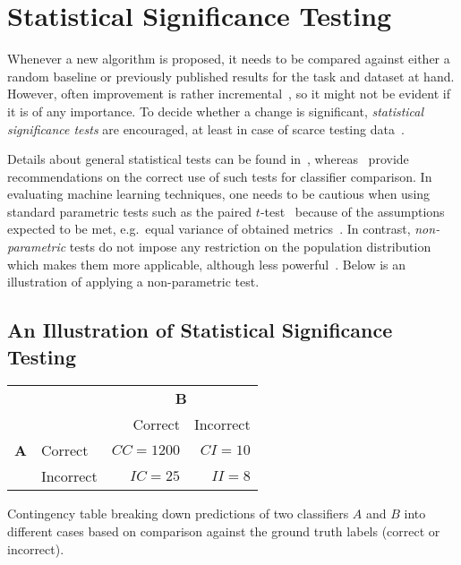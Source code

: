 \section{Statistical Significance Testing}

Whenever a new algorithm is proposed, it needs to be compared against either a random baseline or previously published results for the task and dataset at hand.
However, often improvement is rather incremental~\citep{Hand2006}, so it might not be evident if it is of any importance.
To decide whether a change is significant, \emph{statistical significance tests} are encouraged, at least in case of scarce testing data~\citep{Drummond2010}.

Details about general statistical tests can be found in~\citep{Urdan2011}, whereas~\citet{Japkowic2011} provide recommendations on the correct use of such tests for classifier comparison.
In evaluating machine learning techniques, one needs to be cautious when using standard parametric tests such as the paired $t$-test~\citep{Urdan2011} because of the assumptions expected to be met, e.g.\ equal variance of obtained metrics~\citep{Japkowic2011}. In contrast, \emph{non-parametric} tests do not impose any restriction on the population distribution which makes them more applicable, although less powerful~\citep{Colquhoun1971}.
%
Below is an illustration of applying a non-parametric test.

\subsection{An Illustration of Statistical Significance Testing}
\begin{margintable}
    \begin{tabular}{llrr}
        \toprule
        & & \multicolumn{2}{c}{\textbf{B}} \\
        & & Correct & Incorrect \\ \midrule
        \textbf{A} & Correct & $CC = 1200$ & $CI = 10$ \\
        & Incorrect & $IC = 25$   & $II = 8$  \\
        \bottomrule
    \end{tabular}
    \caption{Contingency table breaking down predictions of two classifiers $A$ and $B$ into different cases based on comparison against the ground truth labels (correct or incorrect).}
    \label{tab:eval-mcnemar-table}
\end{margintable}

